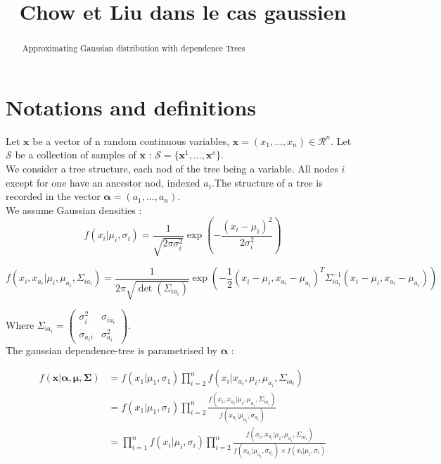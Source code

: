 \documentclass[a4paper,10pt]{article}
\title{Chow et Liu dans le cas gaussien}
\author{}
\begin{document}
\maketitle

\begin{abstract}
Approximating Gaussian distribution with dependence Trees
\end{abstract}

\section{Notations and definitions}
Let $\bm{x}$ be a vector of n random continuous variables, $\bm{x}=(x_1,...,x_n)\in \mathcal{R}^n$. Let
$\mathcal{S}$ be a collection of samples of $\bm{x}$ : $\mathcal{S}=\{\bm{x}^1,...,\bm{x}^s\}$.\\

We consider a tree structure, each nod of the tree being a variable. All nodes $i$ except for one have an ancestor nod,
 indexed $a_i$.The structure of a tree is recorded in the vector $\bm{\alpha}=(a_1,...,a_n)$.\\

We assume Gaussian densities : 
\[f(x_i |\mu_i,\sigma_i) = \frac{1}{\sqrt{2 \pi \sigma_i^2}}\exp\left(-\frac{(x_i-\mu_i)^2}{2\sigma_i^2} \right) \]


\[f(x_i,x_{a_i} |\mu_i,\mu_{a_i},\Sigma_{ia_i}) = \frac{1}{2 \pi\sqrt{ \det(\Sigma_{ia_i})}}\exp\left(-\frac{1}{2}(x_i-\mu_i,x_{a_i}-\mu_{a_i})^T \Sigma_{ia_i}^{-1}(x_i-\mu_i,x_{a_i}-\mu_{a_i}) \right) \]

Where $\Sigma_{ia_i} = \begin{pmatrix}
\sigma_i^2 & \sigma_{ia_i} \\
\sigma_{a_ii} & \sigma_{a_i}^2
\end{pmatrix}$.\\

The gaussian dependence-tree is parametrised by $\bm{\alpha}$ :



\begin{align*} 
f(\bm{x}|\bm{\alpha},\bm{\mu},\bm{\Sigma}) &= f(x_1|\mu_1, \sigma_1) \prod_{i=2}^{n} f(x_i|x_{a_i},\mu_i, \mu_{a_i},\Sigma_{ia_i})\\
 &= f(x_1|\mu_1, \sigma_1) \prod_{i=2}^{n} \frac{f(x_i,x_{a_i}|\mu_i, \mu_{a_i},\Sigma_{ia_i})}{f(x_{a_i}|\mu_{a_i},\sigma_{a_i})}\\
  &= \prod_{i=1}^{n}f(x_i|\mu_i, \sigma_i) \prod_{i=2}^{n} \frac{f(x_i,x_{a_i}|\mu_i, \mu_{a_i},\Sigma_{ia_i})}
  {f(x_{a_i}|\mu_{a_i},\sigma_{a_i})\times f(x_i|\mu_i,\sigma_i)}
\end{align*}
\end{document}
